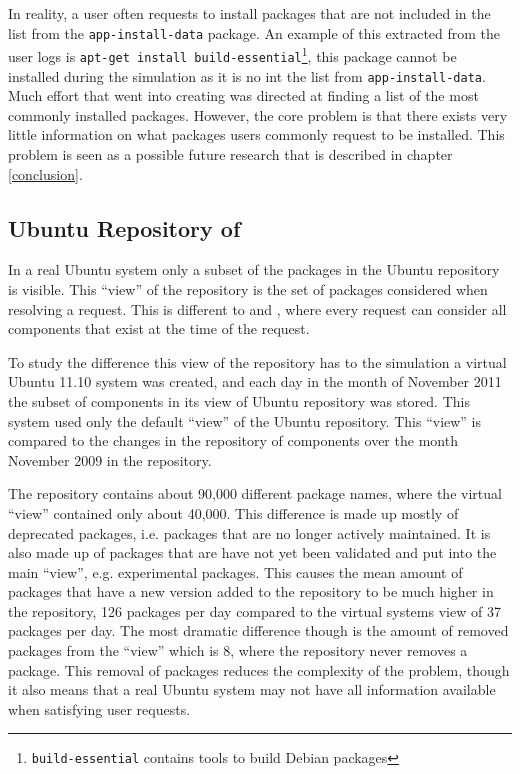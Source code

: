 In reality, a user often requests to install packages that are not included in the list from the \texttt{app-install-data} package. 
An example of this extracted from the user logs is \texttt{apt-get install build-essential}\footnote{\texttt{build-essential} contains tools to build Debian packages},
this package cannot be installed during the simulation as it is no int the list from  \texttt{app-install-data}.
Much effort that went into creating \usermodel was directed at finding a list of the most commonly installed packages.
However, the core problem is that there exists very little information on what packages users commonly request to be installed.
This problem is seen as a possible future research that is described in chapter \ref{conclusion}. 

\subsection{Ubuntu Repository of \usermodel}
In a real Ubuntu system only a subset of the packages in the Ubuntu repository is visible.
This ``view'' of the repository is the set of packages considered when resolving a request.
This is different to \modelname and \usermodel, 
where every request can consider all components that exist at the time of the request. 

To study the difference this view of the repository has to the simulation a virtual Ubuntu 11.10 system was created, 
and each day in the month of November 2011 the subset of components in its view of Ubuntu repository was stored.
This system used only the default ``view'' of the Ubuntu repository.
This ``view'' is compared to the changes in the repository of components over the month November 2009 in the \usermodel repository.

The \usermodel repository contains about 90,000 different package names, where the virtual ``view'' contained only about 40,000.
This difference is made up mostly of deprecated packages, i.e. packages that are no longer actively maintained.
It is also made up of packages that are have not yet been validated and put into the main ``view'', e.g. experimental packages. 
This causes the mean amount of packages that have a new version added to the repository to be much higher in the \usermodel repository,
126 packages per day compared to the virtual systems view of 37 packages per day.
The most dramatic difference though is the amount of removed packages from the ``view'' which is 8, where the \usermodel repository never removes a package.
This removal of packages reduces the complexity of the problem, 
though it also means that a real Ubuntu system may not have all information available when satisfying user requests. 

